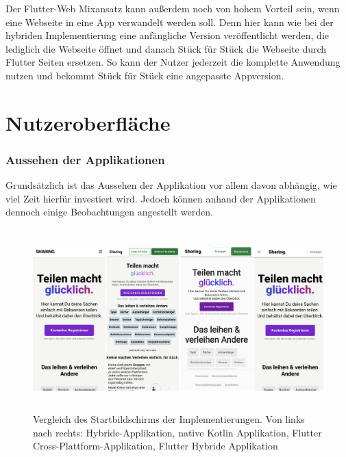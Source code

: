 Der Flutter-Web Mixansatz kann außerdem noch von hohem Vorteil sein, wenn eine Webseite in eine App verwandelt werden soll. Denn hier kann wie bei der hybriden Implementierung eine anfängliche Version veröffentlicht werden, die lediglich die Webseite öffnet und danach Stück für Stück die Webseite durch Flutter Seiten ersetzen. So kann der Nutzer jederzeit die komplette Anwendung nutzen und bekommt Stück für Stück eine angepasste Appversion.

\section{Nutzeroberfläche}
\subsubsection{Aussehen der Applikationen}
Grundsätzlich ist das Aussehen der Applikation vor allem davon abhängig, wie viel Zeit hierfür investiert wird. Jedoch können anhand der Applikationen dennoch einige Beobachtungen angestellt werden.

\begin{figure}[ht]
  \centering
  \includegraphics[height=7cm,keepaspectratio]{images/Startbildschirm_vergleich.png} 
  \caption[Vergleich des Startbildschirms der Implementierungen]{Vergleich des Startbildschirms der Implementierungen. Von links nach rechts: Hybride-Applikation, native Kotlin Applikation, Flutter Cross-Plattform-Applikation, Flutter Hybride Applikation}
  \label{fig:startscreen}
\end{figure}

